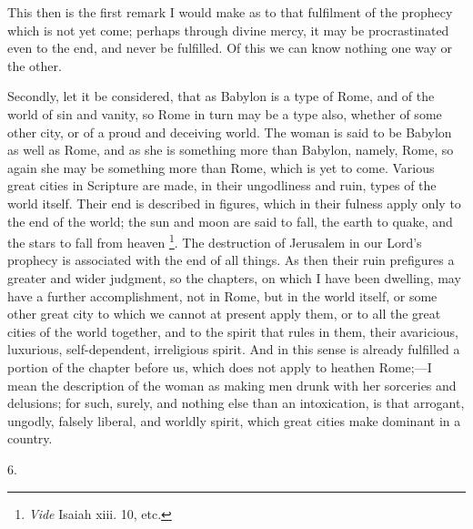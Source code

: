 This then is the first remark I would make as to that fulfilment of
the prophecy which is not yet come; perhaps through divine mercy, it
may be procrastinated even to the end, and never be fulfilled. Of this
we can know nothing one way or the other.

Secondly, let it be considered, that as Babylon is a type of Rome,
and of the world of sin and vanity, so Rome in turn may be a type
also, whether of some other city, or of a proud and deceiving world.
The woman is said to be Babylon as well as Rome, and as she is
something more than Babylon, namely, Rome, so again she may be
something more than Rome, which is yet to come. Various great cities
in Scripture are made, in their ungodliness and ruin, types of the
world itself. Their end is described in figures, which in their
fulness apply only to the end of the world; the sun and moon are said
to fall, the earth to quake, and the stars to fall from heaven \footnote{\emph{Vide} Isaiah xiii. 10, etc.}. The
destruction of Jerusalem in our Lord's prophecy is associated with the
end of all things. As then their ruin prefigures a greater and wider
judgment, so the chapters, on which I have been dwelling, may have a
further accomplishment, not in Rome, but in the world itself, or some
other great city to which we cannot at present apply them, or to all
the great cities of the world together, and to the spirit that rules
in them, their avaricious, luxurious, self-dependent, irreligious
spirit. And in this sense is already fulfilled a portion of the
chapter before us, which does not apply to heathen Rome;—I mean
the description of the woman as making men drunk with her sorceries
and delusions; for such, surely, and nothing else than an
intoxication, is that arrogant, ungodly, falsely liberal, and worldly
spirit, which great cities make dominant in a country.

6.

